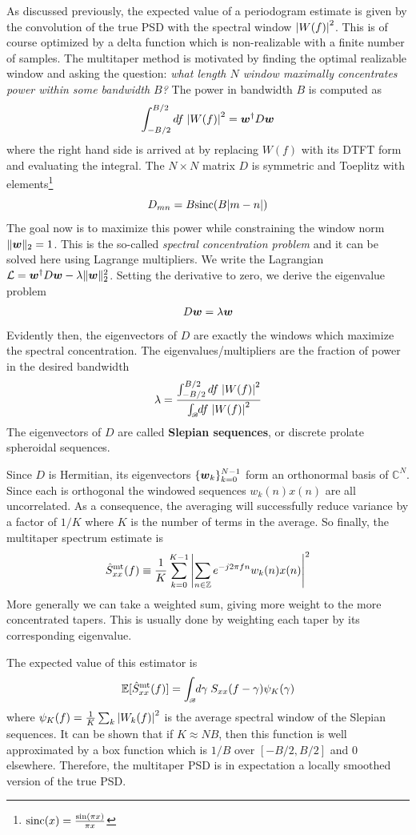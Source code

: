 \documentclass[twocolumn]{gwclass}
\newcommand{\C}{\mathbb{C}}
\newcommand{\Z}{\mathbb{Z}}
\newcommand{\intbw}[1]{\int_{\hspace{-0.1em}\scriptscriptstyle\mathscr{B}}\hspace{-0.25em}}
\begin{document}
As discussed previously, the expected value of a periodogram estimate is given by the convolution of the true PSD with the spectral window $\abs{W(f)}^2$. This is of course optimized by a delta function which is non-realizable with a finite number of samples. The multitaper method is motivated by finding the optimal realizable window and asking the question: \emph{what length $N$ window maximally concentrates power within some bandwidth $B$?} The power in bandwidth $B$ is computed as
$$ \int_{-B/2}^{B/2}df\;\abs{W(f)}^2 = 
\boldsymbol{w}^\dagger D\boldsymbol{w}$$
where the right hand side is arrived at by replacing $W(f)$ with its DTFT form and evaluating the integral. The $N\times N$ matrix $D$ is symmetric and Toeplitz with elements\footnote{$\text{\normalfont{sinc}}(x)=\frac{\sin(\pi x)}{\pi x}$}
$$ D_{mn} = B\text{\normalfont{sinc}}(B|m-n|) $$
The goal now is to maximize this power while constraining the window norm $\|\boldsymbol{w}\|_2=1$. This is the so-called \emph{spectral concentration problem} and it can be solved here using Lagrange multipliers. We write the Lagrangian $ \mathcal{L} = \boldsymbol{w}^\dagger D\boldsymbol{w} - \lambda \|\boldsymbol{w}\|_2^2 $. Setting the derivative to zero, we derive the eigenvalue problem
$$ D\boldsymbol{w} = \lambda\boldsymbol{w} $$
Evidently then, the eigenvectors of $D$ are exactly the windows which maximize the spectral concentration. The eigenvalues/multipliers are the fraction of power in the desired bandwidth
$$ \lambda = \frac{\int_{-B/2}^{B/2}df\;\abs{W(f)}^2}{\intbw{1} df\;\abs{W(f)}^2} $$
The eigenvectors of $D$ are called \textbf{Slepian sequences}, or discrete prolate spheroidal sequences. 

Since $D$ is Hermitian, its eigenvectors $\{\boldsymbol{w}_k\}_{k=0}^{N-1}$ form an orthonormal basis of $\C^N$. Since each is orthogonal the windowed sequences $w_k(n)x(n)$ are all uncorrelated. As a consequence, the averaging will successfully reduce variance by a factor of $1/K$ where $K$ is the number of terms in the average. So finally, the multitaper spectrum estimate is
$$ \hat{S}_{xx}^\t{mt}(f) \equiv \frac{1}{K}\sum_{k=0}^{K-1}\abs{\sum_{n\in\Z}e^{-j2\pi f n}w_k(n)x(n)}^2 $$
More generally we can take a weighted sum, giving more weight to the more concentrated tapers. This is usually done by weighting each taper by its corresponding eigenvalue.

The expected value of this estimator is 
$$ \mathbb{E}[\hat{S}_{xx}^\t{mt}(f)] = \intbw{1} d\gamma\;S_{xx}(f-\gamma)\psi_K(\gamma) $$
where $\psi_K(f) = \frac{1}{K}\sum_k \abs{W_k(f)}^2$ is the average spectral window of the Slepian sequences. It can be shown that if $K\approx NB$, then this function is well approximated by a box function which is $1/B$ over $[-B/2,B/2]$ and 0 elsewhere. Therefore, the multitaper PSD is in expectation a locally smoothed version of the true PSD.
\end{document}
